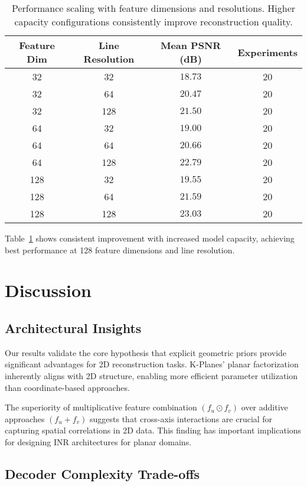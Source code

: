 \documentclass[10pt,twocolumn,letterpaper]{article}
\begin{document}
\begin{table}[t]
\centering
\small
\begin{tabular}{@{}cccc@{}}
\toprule
\textbf{Feature Dim} & \textbf{Line Resolution} & \textbf{Mean PSNR (dB)} & \textbf{Experiments} \\
\midrule
32 & 32 & $18.73$ & 20 \\
32 & 64 & $20.47$ & 20 \\
32 & 128 & $21.50$ & 20 \\
\midrule
64 & 32 & $19.00$ & 20 \\
64 & 64 & $20.66$ & 20 \\
64 & 128 & $22.79$ & 20 \\
\midrule
128 & 32 & $19.55$ & 20 \\
128 & 64 & $21.59$ & 20 \\
128 & 128 & $\mathbf{23.03}$ & 20 \\
\bottomrule
\end{tabular}
\caption{Performance scaling with feature dimensions and resolutions. Higher capacity configurations consistently improve reconstruction quality.}
\label{tab:scaling_analysis}
\end{table}

Table~\ref{tab:scaling_analysis} shows consistent improvement with increased model capacity, achieving best performance at 128 feature dimensions and line resolution.

\section{Discussion}

\subsection{Architectural Insights}

Our results validate the core hypothesis that explicit geometric priors provide significant advantages for 2D reconstruction tasks. K-Planes' planar factorization inherently aligns with 2D structure, enabling more efficient parameter utilization than coordinate-based approaches.

The superiority of multiplicative feature combination $(f_u \odot f_v)$ over additive approaches $(f_u + f_v)$ suggests that cross-axis interactions are crucial for capturing spatial correlations in 2D data. This finding has important implications for designing INR architectures for planar domains.

\subsection{Decoder Complexity Trade-offs}
\end{document}
